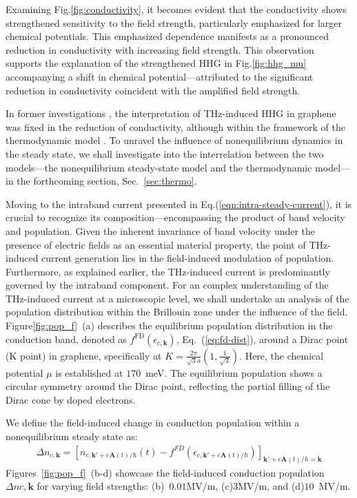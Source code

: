 Examining Fig.\ref{fig:conductivity}, it becomes evident that the conductivity shows strengthened sensitivity to the field strength, particularly emphasized for larger chemical potentials. This emphasized dependence manifests as a pronounced reduction in conductivity with increasing field strength. This observation supports the explanation of the strengthened HHG in Fig.\ref{fig:hhg_mu} accompanying a shift in chemical potential—attributed to the significant reduction in conductivity coincident with the amplified field strength.

In former investigations \cite{hafez2018extremely,kovalev2021electrical}, the interpretation of THz-induced HHG in graphene was fixed in the reduction of conductivity, although within the framework of the thermodynamic model \cite{mics2015thermodynamic}. To unravel the influence of nonequilibrium dynamics in the steady state, we shall investigate into the interrelation between the two models—the nonequilibrium steady-state model and the thermodynamic model—in the forthcoming section, Sec.~\ref{sec:thermo}.

Moving to the intraband current presented in Eq.(\ref{eqn:intra-steady-current}), it is crucial to recognize its composition—encompassing the product of band velocity and population. Given the inherent invariance of band velocity under the presence of electric fields as an essential material property, the point of THz-induced current generation lies in the field-induced modulation of population. Furthermore, as explained earlier, the THz-induced current is predominantly governed by the intraband component. For an complex understanding of the THz-induced current at a microscopic level, we shall undertake an analysis of the population distribution within the Brillouin zone under the influence of the field. Figure\ref{fig:pop_f}~(a) describes the equilibrium population distribution in the conduction band, denoted as $f^{\mathrm{FD}}(\epsilon_{c,\mathbf k})$, Eq.~(\ref{eq:fd-dist}), around a Dirac point (K point) in graphene, specifically at $K =\frac{2\pi}{\sqrt{3}a}\left(1, \frac{1}{\sqrt{3}}\right)$. Here, the chemical potential $\mu$ is established at $170$~meV. The equilibrium population shows a circular symmetry around the Dirac point, reflecting the partial filling of the Dirac cone by doped electrons.

We define the field-induced change in conduction population within a nonequilibrium steady
state as:
\begin{align}
	\Delta n_{c,\mathbf{k}}= \left [n_{c, \mathbf{k}'+e\mathbf{A}(t)/\hbar}(t)- f^{FD}(\epsilon_{c,\mathbf{k}'+e\mathbf A (t)/\hbar})\right ]_{\mathbf k'+e\mathbf A(t)/\hbar =\mathbf k}
\end{align}
Figures~\ref{fig:pop_f}~(b-d) showcase the field-induced conduction population $\Delta n{c,\mathbf{k}}$ for varying field strengths: (b)~$0.01$MV/m, (c)$3$MV/m, and (d)$10$~MV/m.

